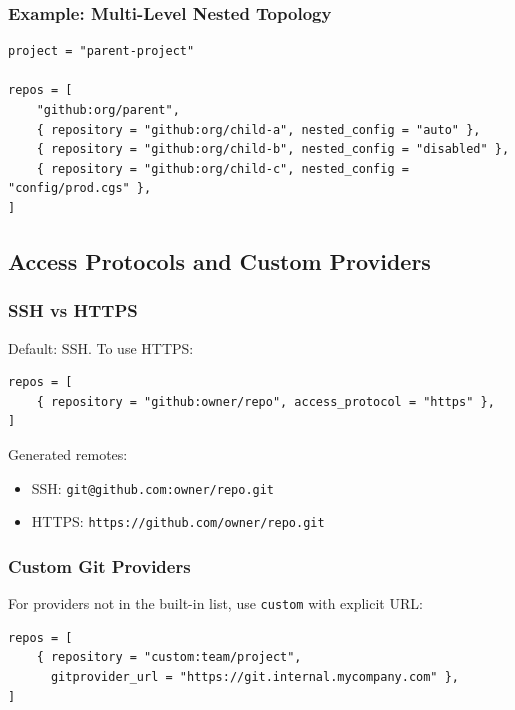 \subsubsection{Example: Multi-Level Nested Topology}

\begin{lstlisting}
project = "parent-project"

repos = [
    "github:org/parent",
    { repository = "github:org/child-a", nested_config = "auto" },
    { repository = "github:org/child-b", nested_config = "disabled" },
    { repository = "github:org/child-c", nested_config = "config/prod.cgs" },
]
\end{lstlisting}

\subsection{Access Protocols and Custom Providers}
\label{subsec:cgs-protocols}

\subsubsection{SSH vs HTTPS}

Default: SSH. To use HTTPS:

\begin{lstlisting}
repos = [
    { repository = "github:owner/repo", access_protocol = "https" },
]
\end{lstlisting}

Generated remotes:

\begin{itemize}
  \item SSH: \texttt{git@github.com:owner/repo.git}
  \item HTTPS: \texttt{https://github.com/owner/repo.git}
\end{itemize}

\subsubsection{Custom Git Providers}

For providers not in the built-in list, use \texttt{custom} with explicit URL:

\begin{lstlisting}
repos = [
    { repository = "custom:team/project", 
      gitprovider_url = "https://git.internal.mycompany.com" },
]
\end{lstlisting}

